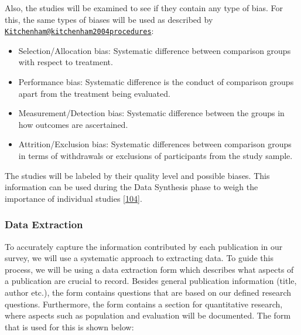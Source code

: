 \documentclass[]{book}
\providecommand{\tightlist}{%
  \setlength{\itemsep}{0pt}\setlength{\parskip}{0pt}}
\begin{document}
Also, the studies will be examined to see if they contain any type of
bias. For this, the same types of biases will be used as described by
\href{mailto:Kitchenham@kitchenham2004procedures}{\nolinkurl{Kitchenham@kitchenham2004procedures}}:

\begin{itemize}
\tightlist
\item
  Selection/Allocation bias: Systematic difference between comparison
  groups with respect to treatment.
\item
  Performance bias: Systematic difference is the conduct of comparison
  groups apart from the treatment being evaluated.
\item
  Measurement/Detection bias: Systematic difference between the groups
  in how outcomes are ascertained.
\item
  Attrition/Exclusion bias: Systematic differences between comparison
  groups in terms of withdrawals or exclusions of participants from the
  study sample.
\end{itemize}

The studies will be labeled by their quality level and possible biases.
This information can be used during the Data Synthesis phase to weigh
the importance of individual studies
{[}\protect\hyperlink{ref-kitchenham2004procedures}{104}{]}.

\subsubsection{Data Extraction}\label{data-extraction}

To accurately capture the information contributed by each publication in
our survey, we will use a systematic approach to extracting data. To
guide this process, we will be using a data extraction form which
describes what aspects of a publication are crucial to record. Besides
general publication information (title, author etc.), the form contains
questions that are based on our defined research questions. Furthermore,
the form contains a section for quantitative research, where aspects
such as population and evaluation will be documented. The form that is
used for this is shown below:
\end{document}
